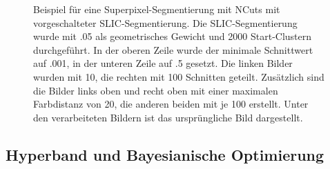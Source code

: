 \documentclass[
  12pt,
  openany]{book}
\begin{document}
\begin{figure}
{}

\caption[Beispiel für eine Superpixel-Segmentierung mit NCuts]{Beispiel für eine Superpixel-Segmentierung mit NCuts mit vorgeschalteter SLIC-Segmentierung. Die SLIC-Segmentierung wurde mit .05 als geometrisches Gewicht und 2000 Start-Clustern durchgeführt. In der oberen Zeile wurde der minimale Schnittwert auf .001, in der unteren Zeile auf .5 gesetzt. Die linken Bilder wurden mit 10, die rechten mit 100 Schnitten geteilt. Zusätzlich sind die Bilder links oben und recht oben mit einer maximalen Farbdistanz von 20, die anderen beiden mit je 100 erstellt. Unter den verarbeiteten Bildern ist das ursprüngliche Bild dargestellt.}\label{fig:ncutsClassic}
\end{figure}

\hypertarget{hyperband-und-bayesianische-optimierung}{%
\subsection{Hyperband und Bayesianische Optimierung}\label{hyperband-und-bayesianische-optimierung}}
\end{document}
